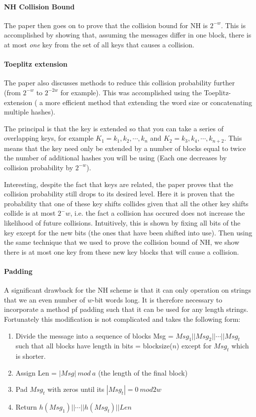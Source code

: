 \documentclass[10pt]{article} %
\begin{document}
\paragraph{NH Collision Bound}

The paper then goes on to prove that the collision bound for NH is $2^{-w}$.
This is accomplished by showing that, assuming the messages differ in one
block, there is at most \emph{one} key from the set of all keys that causes a
collision.

\paragraph{Toeplitz extension}

The paper also discusses methods to reduce this collision probability further
(from $2^{-w}$ to $2^{-2w}$ for example). This was accomplished using the
Toeplitz-extension ( a more efficient method that extending the word size or
concatenating multiple hashes).

The principal is that the key is extended so that you can take a series of
overlapping keys, for example $K_1 = k_1,k_2,\cdots,k_n$ and $K_2 =
k_3,k_4,\cdots,k_{n+2}$. This means that the key need only be extended by a
number of blocks equal to twice the number of additional hashes you will be using
(Each one decreases by collision probability by $2^{-w}$).

Interesting, despite the fact that keys are related, the paper proves that the
collision probability still drops to its desired level. Here it is proven that
the probability that one of these key shifts collides given that all the other
key shifts collide is at most $2^-w$, i.e. the fact a collision has occured
does not increase the likelihood of future collisions. Intuitively, this is
shown by fixing all bits of the key except for the new bits (the ones that have
been shifted into use). Then using the same technique that we used to prove the
collision bound of NH, we show there is at most one key from these new key
blocks that will cause a collision.

\paragraph{Padding}

A significant drawback for the NH scheme is that it can only operation on
strings that we an even number of $w$-bit words long. It is therefore necessary
to incorporate a method pf padding such that it can be used for any length
strings. Fortunately this modification is not complicated and takes the
following form:
\begin{enumerate}
\item Divide the message into a sequence of blocks Msg =
$Msg_1||Msg_2||\cdots||Msg_t$ such that all blocks have length in bits =
blocksize($n$) except for $Msg_t$ which is shorter.
\item Assign Len = $|Msg|\ mod\ a$ (the length of the final block)
\item Pad $Msg_t$ with zeros until its $|Msg_t| = 0\ mod 2w$
\item Return $h(Msg_1)||\cdots||h(Msg_t)||Len$
\end{enumerate}
\end{document}
